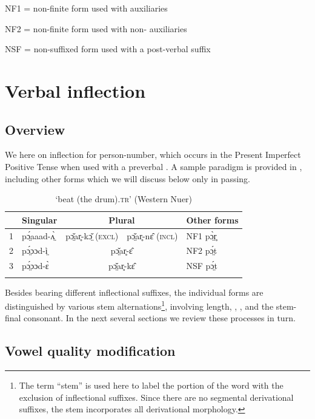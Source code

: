 \documentclass[output=paper,newtxmath,modfonts,nonflat]{langsci/langscibook}
\begin{document}
\pagebreak

NF1 = non-finite form used with  auxiliaries

NF2 = non-finite form used with non- auxiliaries

NSF = non-suffixed form used with a post-verbal suffix

\section{Verbal inflection}
\subsection{Overview} %

We  here on inflection for  person-number, which occurs in the Present Imperfect Positive Tense when used with a preverbal . A sample paradigm is provided in , including other forms which we will discuss below only in passing.

\begin{table}
\begin{tabularx}{\textwidth}{llrll}
\lsptoprule
 & \bfseries Singular & \multicolumn{2}{c}{\bfseries Plural} & \bfseries Other forms\\
\midrule
1  & pɔ̤́aaad-ʌ̤̀ & \multicolumn{1}{r}{pɔ̤̌ar̥-kɔ̤̌ (\textsc{excl})} & \multicolumn{1}{l}{pɔ̤̌ar̥-nɛ̂ (\textsc{incl})} & NF1 pɔ̤̀r̥\\
2 & pɔ̤́ɔɔd-ì̤ & \multicolumn{2}{c}{pɔ̤̌ar̥-ɛ̂} & NF2 pɔ̤́t\\
3 & pɔ̤́ɔɔd-ɛ̀ & \multicolumn{2}{c}{pɔ̤̌ar̥-kɛ̂} & NSF pɔ̤́t\\
\lspbottomrule
\end{tabularx}
\caption{‘beat (the drum)\textsc{.tr}’ (Western Nuer)}
\label{tab:monich:3}
\end{table}


Besides bearing different inflectional suffixes, the individual forms are distinguished by various stem alternations\footnote{The term “stem” is used here to label the portion of the word with the exclusion of inflectional suffixes. Since there are no segmental derivational suffixes, the stem incorporates all derivational morphology.}, involving length, , , and the stem-final consonant. In the next several sections we review these processes in turn. 

\subsection{Vowel quality modification} %
\end{document}
